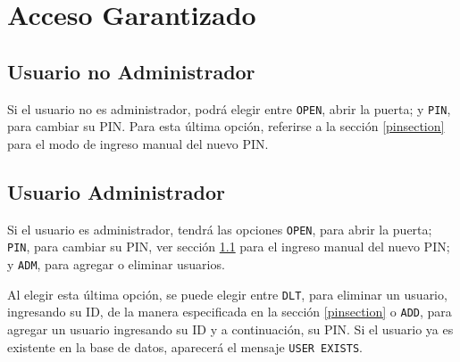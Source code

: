\section{Acceso Garantizado}
\subsection{Usuario no Administrador}
\label{noadminmenu}
Si el usuario no es administrador, podrá elegir entre \texttt{OPEN}, abrir la puerta; y \texttt{PIN},
para cambiar su PIN. Para esta última opción, referirse a la sección \ref{pinsection} para 
el modo de ingreso manual del nuevo PIN.
\subsection{Usuario Administrador}
 \label{adminmenu}
 Si el usuario es administrador, tendrá las opciones \texttt{OPEN}, para abrir la puerta; \texttt{PIN}, 
 para cambiar su PIN, ver sección \ref{noadminmenu} para el ingreso manual del nuevo PIN;
  y \texttt{ADM}, para agregar o eliminar usuarios.\par
  Al elegir esta última opción, se puede elegir entre \texttt{DLT}, para eliminar un usuario, ingresando su ID,
  de la manera especificada en la sección \ref{pinsection} o \texttt{ADD}, para agregar un usuario 
  ingresando su ID y a continuación, su PIN. Si el usuario ya es existente en la base de datos, 
  aparecerá el mensaje \texttt{USER EXISTS}.



